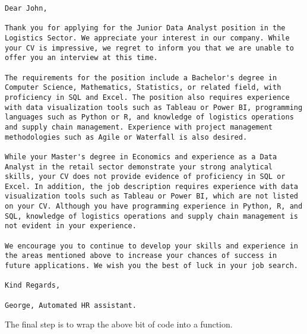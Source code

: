 \documentclass[
  letterpaper,
  DIV=11,
  numbers=noendperiod]{scrartcl}
\begin{document}
\begin{verbatim}
Dear John,

Thank you for applying for the Junior Data Analyst position in the Logistics Sector. We appreciate your interest in our company. While your CV is impressive, we regret to inform you that we are unable to offer you an interview at this time.

The requirements for the position include a Bachelor's degree in Computer Science, Mathematics, Statistics, or related field, with proficiency in SQL and Excel. The position also requires experience with data visualization tools such as Tableau or Power BI, programming languages such as Python or R, and knowledge of logistics operations and supply chain management. Experience with project management methodologies such as Agile or Waterfall is also desired.

While your Master's degree in Economics and experience as a Data Analyst in the retail sector demonstrate your strong analytical skills, your CV does not provide evidence of proficiency in SQL or Excel. In addition, the job description requires experience with data visualization tools such as Tableau or Power BI, which are not listed on your CV. Although you have programming experience in Python, R, and SQL, knowledge of logistics operations and supply chain management is not evident in your experience.

We encourage you to continue to develop your skills and experience in the areas mentioned above to increase your chances of success in future applications. We wish you the best of luck in your job search.

Kind Regards,

George, Automated HR assistant.
\end{verbatim}

The final step is to wrap the above bit of code into a function.
\end{document}
